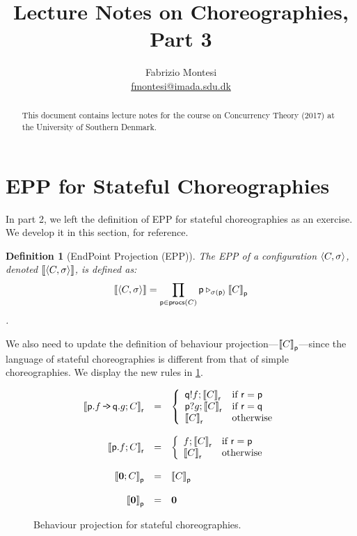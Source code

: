 \documentclass[a4paper,12pt]{article}
\title{Lecture Notes on Choreographies, Part 3}
\author{
	Fabrizio Montesi
	\\
	\href{mailto:fmontesi@imada.sdu.dk}{fmontesi@imada.sdu.dk}
}
\newtheorem{definition}{Definition}
\newcommand*{\m}[1]{\ensuremath{\mathsf{#1}}}
\newcommand*{\pid}[1]{\m{#1}}
\newcommand*{\com}[2]{\ensuremath{#1 \, \mbox{\tt{-\!>}}\, #2}}
\newcommand*{\nil}{\ensuremath{\boldsymbol{0}}\xspace}
\newcommand*{\procv}[3]{\ensuremath{{#1} \triangleright_{#2} #3}}
\newcommand*{\psendf}[2]{\ensuremath{{#1}!#2}}
\newcommand*{\precvf}[2]{\ensuremath{{#1}?#2}}
\newcommand*{\procs}{\m{procs}\xspace}
\begin{document}
\maketitle

\begin{abstract}
This document contains lecture notes for the course on Concurrency Theory (2017) at the University 
of Southern Denmark.
\end{abstract}

\section{EPP for Stateful Choreographies}

In part 2, we left the definition of EPP for stateful choreographies as an exercise. We develop it 
in this section, for reference.

\begin{definition}[EndPoint Projection (EPP)]
\label{def:epp}
The EPP of a configuration $\rc{C}[\sigma]$, denoted $\epp{\rc{C}[\sigma]}$, is defined as:
\[
\epp{\rc C[\sigma]} = \prod_{\pid p \in \procs(C)} \procv{\pid p}{\sigma(\pid p)}{\epp{C}[\pid p]}
\]
.
\end{definition}

We also need to update the definition of behaviour projection---$\epp{C}[\pid p]$---since the 
language of stateful choreographies is different from that of simple choreographies. We display the 
new rules in \cref{fig:b_proj_stateful}.

\begin{figure}
\begin{displaymath}
\begin{array}{rcl}
\epp{\com{\pid p.f}{\pid q.g}; C}[\pid r] & = &
\left\{
	\begin{array}{ll}
		\psendf{\pid q}f;\epp{C}[\pid r] & \mbox{if } \pid r = \pid p\\
		\precvf{\pid p}g;\epp{C}[\pid r] & \mbox{if } \pid r = \pid q\\
		
		\epp{C}[\pid r] & \mbox{otherwise}
	\end{array}
\right.
\\\\
\epp{\pid p.f;C}[\pid r] & = & 
\left\{
	\begin{array}{ll}
		f;\epp{C}[\pid r] & \mbox{if } \pid r = \pid p\\
		\epp{C}[\pid r] & \mbox{otherwise}
	\end{array}
\right.
\\\\
\epp{\nil;C}[\pid p] & = & \epp{C}[\pid p]
\\\\
\epp{\nil}[\pid p] & = & \nil
\end{array}
\end{displaymath}
\caption{Behaviour projection for stateful choreographies.}
\label{fig:b_proj_stateful}
\end{figure}
\end{document}
